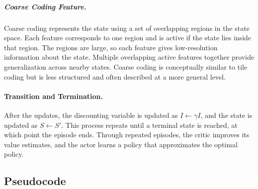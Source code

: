 \documentclass{article}
\begin{document}
\subparagraph{Coarse Coding Feature.}
Coarse coding represents the state using a set of overlapping regions in the state space. Each feature corresponds to one region and is active if the state lies inside that region. The regions are large, so each feature gives low-resolution information about the state. Multiple overlapping active features together provide generalization across nearby states. Coarse coding is conceptually similar to tile coding but is less structured and often described at a more general level.

\paragraph{Transition and Termination.}
After the updates, the discounting variable is updated as $I \leftarrow \gamma I$, and the state is updated as $S \leftarrow S'$. This process repeats until a terminal state is reached, at which point the episode ends. Through repeated episodes, the critic improves its value estimates, and the actor learns a policy that approximates the optimal policy.


\subsection{Pseudocode}
\end{document}
